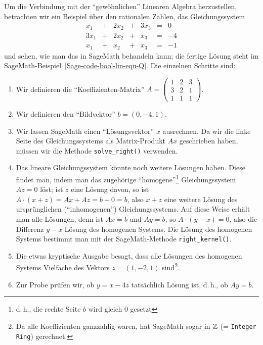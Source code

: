 \begin{refsegment}
Um die Verbindung mit der "`gewöhnlichen"' Linearen
Algebra herzustellen,
betrachten wir ein Beispiel über den rationalen Zahlen, das
Gleichungssystem
\[
\begin{matrix}
            x_1 & + & 2 x_2 & + & 3 x_3 & = &  0 \\
          3 x_1 & + & 2 x_2 & + &   x_3 & = & -4 \\
            x_1 & + &   x_2 & + &   x_3 & = & -1
\end{matrix}
\]
und sehen, wie man das in SageMath behandeln kann; die fertige Lösung steht
im SageMath-Beispiel~\ref{Sage-code-bool-lin-equ-Q}. Die einzelnen Schritte
sind:
\begin{enumerate}
   \item Wir definieren die "`Koeffizienten-Matrix"'
         $A = \begin{pmatrix} 1 & 2 & 3 \\ 3 & 2 & 1 \\ 1 & 1 & 1 \end{pmatrix}$.
   \item Wir definieren den "`Bildvektor"' $b = (0, -4, 1)$.
   \item Wir lassen SageMath einen "`Lösungsvektor"' $x$ ausrechnen. Da wir
         die linke Seite des Gleichungssystems als Matrix-Produkt $A x$
         geschrieben haben, müssen wir die Methode {\tt solve\_right()}
         verwenden.
   \item Das lineare Gleichungssystem könnte noch weitere Lösungen haben.
         Diese findet man, indem man das zugehörige "`homogene"'\footnote{%
         d.\,h., die rechte Seite $b$ wird gleich $0$ gesetzt}
         Gleichungssystem $A z = 0$ löst; ist $z$ eine Lösung davon,
         so ist $A \cdot (x+z) = A x + A z = b + 0 = b$, also $x+z$
         eine weitere Lösung des ursprünglichen ("`inhomogenen"')
         Gleichungssystems. Auf diese Weise erhält man alle Lösungen,
         denn ist $A x = b$ und $A y = b$, so $A \cdot (y - x) = 0$,
         also die Differenz $y - x$ Lösung des homogenen Systems.
         Die Lösung des homogenen Systems bestimmt man mit der SageMath-Methode
         {\tt right\_kernel()}.
   \item Die etwas kryptische Ausgabe besagt, dass alle Lösungen des
         homogenen Systems Vielfache des Vektors $z = (1,-2,1)$ sind\footnote{%
         Da alle Koeffizienten ganzzahlig waren, hat SageMath sogar in $\mathbb{Z}$
         (= {\tt Integer Ring}) gerechnet.
         }.
   \item Zur Probe prüfen wir, ob $y = x - 4z$ tatsächlich Lösung ist,
         d.\,h., ob $A y = b$.
\end{enumerate}


\end{refsegment}
